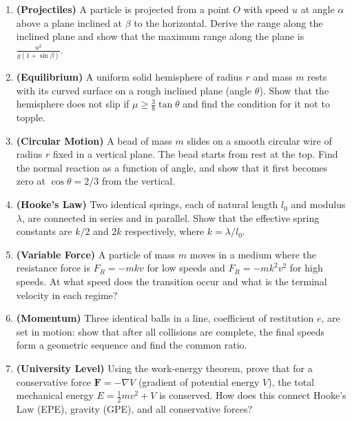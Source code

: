 \documentclass[12pt, a4paper]{book}
\newcommand{\Fvec}{\mathbf{F}}
\begin{document}
\begin{explorationbox}
\begin{enumerate}[leftmargin=1.5em, label=\textbf{E\arabic*.}]
  \item \textbf{(Projectiles)} A particle is projected from a point $O$ with speed $u$ at angle $\alpha$ above a plane inclined at $\beta$ to the horizontal. Derive the range along the inclined plane and show that the maximum range along the plane is $\frac{u^2}{g(1+\sin\beta)}$.
  
  \item \textbf{(Equilibrium)} A uniform solid hemisphere of radius $r$ and mass $m$ rests with its curved surface on a rough inclined plane (angle $\theta$). Show that the hemisphere does not slip if $\mu \geq \frac{3}{8}\tan\theta$ and find the condition for it not to topple.
  
  \item \textbf{(Circular Motion)} A bead of mass $m$ slides on a smooth circular wire of radius $r$ fixed in a vertical plane. The bead starts from rest at the top. Find the normal reaction as a function of angle, and show that it first becomes zero at $\cos\theta = 2/3$ from the vertical.
  
  \item \textbf{(Hooke's Law)} Two identical springs, each of natural length $l_0$ and modulus $\lambda$, are connected in series and in parallel. Show that the effective spring constants are $k/2$ and $2k$ respectively, where $k = \lambda/l_0$.
  
  \item \textbf{(Variable Force)} A particle of mass $m$ moves in a medium where the resistance force is $F_R = -mkv$ for low speeds and $F_R = -mk^2v^2$ for high speeds. At what speed does the transition occur and what is the terminal velocity in each regime?
  
  \item \textbf{(Momentum)} Three identical balls in a line, coefficient of restitution $e$, are set in motion: show that after all collisions are complete, the final speeds form a geometric sequence and find the common ratio.
  
  \item \textbf{(University Level)} Using the work-energy theorem, prove that for a conservative force $\Fvec = -\nabla V$ (gradient of potential energy $V$), the total mechanical energy $E = \frac{1}{2}mv^2 + V$ is conserved. How does this connect Hooke's Law (EPE), gravity (GPE), and all conservative forces?
\end{enumerate}
\end{explorationbox}
\end{document}
